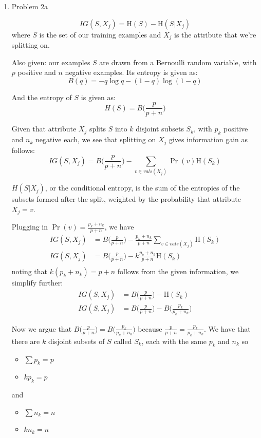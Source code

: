 \documentclass[11pt]{article}
\newenvironment{solution}{\color{blue}{\bf Solution:}}{}
\begin{document}
\begin{enumerate}
\item Problem 2a

\begin{solution}
  \[IG(S,X_j) = \mathrm{H}(S) - \mathrm{H}(S|X_j)\]
  where $S$ is the set of our training examples and $X_j$ is the attribute that
  we're splitting on.
  
  Also given: our examples $S$ are drawn from a Bernoulli random variable, with
  $p$ positive and $n$ negative examples. Its entropy is given as:
  \[B(q) = -q \log q - (1-q) \log (1-q)\]

  And the entropy of $S$ is given as:
  \[H(S) = B\bigg(\frac{p}{p+n}\bigg)\]

  Given that attribute $X_j$ splits $S$ into $k$ disjoint subsets
  $S_k$, with $p_k$ positive and $n_k$ negative each, we see that splitting on
  $X_j$ gives information gain as follows:
  \[
    IG(S,X_j) = B\bigg(\frac{p}{p+n}\bigg) - \sum_{v \in vals(X_j)} \Pr(v)
    \mathrm{H}(S_k)
  \]

  $H(S|X_j)$, or the conditional entropy, is the sum of the entropies of the
  subsets formed after the split, weighted by the probability that attribute
  $X_j = v$.

  Plugging in $\Pr(v) = \frac{p_k + n_k}{p + n}$, we have
  \begin{align*}
    IG(S,X_j) &= B\bigg(\frac{p}{p+n}\bigg) - \frac{p_k + n_k}{p + n}
    \sum_{v \in vals(X_j)} \mathrm{H}(S_k)\\
    IG(S,X_j) &= B\bigg(\frac{p}{p+n}\bigg) - k\frac{p_k + n_k}{p + n}
    \mathrm{H}(S_k)\\
  \end{align*}
  noting that $k(p_k+n_k) = p + n$ follows from the given information, we
  simplify further:
  \begin{align*}
    IG(S,X_j) &= B\bigg(\frac{p}{p+n}\bigg) - \mathrm{H}(S_k)\\
    IG(S,X_j) &= B\bigg(\frac{p}{p+n}\bigg) - B\bigg(\frac{p_k}{p_k+n_k}\bigg)
  \end{align*}

  Now we argue that $B\bigg(\frac{p}{p+n}\bigg) = B\bigg(\frac{p_k}{p_k+n_k}\bigg)$
  because $\frac{p}{p+n} = \frac{p_k}{p_k + n_k}$. We have that there are $k$
  disjoint subsets of $S$ called $S_k$, each with the same $p_k$ and $n_k$ so
  \begin{itemize}
    \item $\sum p_k = p$
    \item $k p_k = p$
  \end{itemize}
  and
  \begin{itemize}
    \item $\sum n_k = n$
    \item $k n_k = n$
  \end{itemize}


\end{solution}
\end{enumerate}
\end{document}
